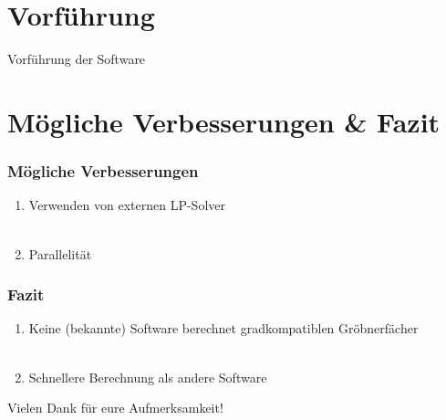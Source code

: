 \documentclass{beamer}
\begin{document}
\section{Vorführung}
\begin{frame}

\centerline{Vorführung der Software}


\end{frame}

\section{Mögliche Verbesserungen \& Fazit}
 
\begin{frame}[<+->]
\frametitle{Mögliche Verbesserungen}


\begin{enumerate}
\item Verwenden von externen LP-Solver %
~\\ ~\\
\item Parallelität
\end{enumerate}


\end{frame}


\begin{frame}[<+->]
\frametitle{Fazit}
\begin{enumerate}
\item Keine (bekannte) Software berechnet gradkompatiblen Gröbnerfächer %
~\\ ~\\
\item Schnellere Berechnung als andere Software
\end{enumerate}


\end{frame} 
 
 
 
 
\begin{frame}
\centerline{Vielen Dank f{\"u}r eure Aufmerksamkeit!}
\end{frame}
\end{document}
